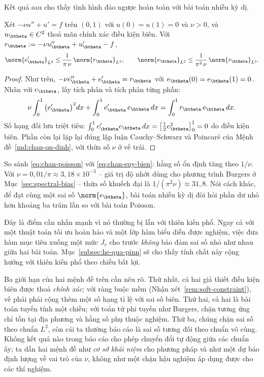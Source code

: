 Kết quả sau cho thấy tình hình đảo ngược hoàn toàn với bài toán nhiễu kỳ dị.
 
\begin{menhde}
\label{md:chan-suy-bien}
Xét $-\nu u'' + u' = f$ trên $(0,1)$ với $u(0) = u(1) = 0$ và $\nu > 0$, và
$u_{\btheta} \in C^2$ thoả mãn chính xác điều kiện biên. Với
$r_{\btheta} := -\nu u_{\btheta}'' + u_{\btheta}' - f$,
\begin{equation}
\norm{e_{\btheta}'}_{L^2} \le \frac{1}{\pi\,\nu}\,\norm{r_{\btheta}}_{L^2},
\qquad
\norm{e_{\btheta}}_{L^2} \le \frac{1}{\pi^{2}\,\nu}\,\norm{r_{\btheta}}_{L^2}.
\label{eq:chan-suy-bien}
\end{equation}
\end{menhde}
 
\begin{proof}
Như trên, $-\nu e_{\btheta}'' + e_{\btheta}' = r_{\btheta}$ với
$e_{\btheta}(0) = e_{\btheta}(1) = 0$. Nhân với $e_{\btheta}$, lấy tích phân và
tích phân từng phần:
\[
\nu\int_0^1 \big(e_{\btheta}'\big)^2 dx
 + \int_0^1 e_{\btheta}'\,e_{\btheta}\,dx
 = \int_0^1 r_{\btheta}\,e_{\btheta}\,dx .
\]
Số hạng đối lưu triệt tiêu:
$\int_0^1 e_{\btheta}'e_{\btheta}\,dx
= \big[\tfrac12 e_{\btheta}^2\big]_0^1 = 0$ do điều kiện biên. Phần còn lại lặp
lại đúng lập luận Cauchy--Schwarz và Poincaré của
Mệnh đề~\ref{md:chan-on-dinh}, với thừa số $\nu$ ở vế trái.
\end{proof}
 
\begin{nhanxet}
\label{nx:doc-chan}
So sánh \eqref{eq:chan-poisson} với \eqref{eq:chan-suy-bien}: hằng số ổn định
tăng theo $1/\nu$. Với $\nu = 0{,}01/\pi \approx 3{,}18\times10^{-3}$ -- giá trị
độ nhớt dùng cho phương trình Burgers ở Mục~\ref{sec:spectral-bias} -- thừa số
khuếch đại là $1/(\pi^2\nu) \approx 31{,}8$. Nói cách khác, để đạt cùng một sai
số $\norm{e_{\btheta}}$, bài toán nhiễu kỳ dị đòi hỏi phần dư nhỏ hơn khoảng ba
trăm lần so với bài toán Poisson.
 
Đây là điểm cần nhấn mạnh vì nó thường bị lẫn với thiên kiến phổ. Ngay cả với một
thuật toán tối ưu hoàn hảo và một lớp hàm biểu diễn được nghiệm, việc đưa hàm mục
tiêu xuống một mức $J_r$ cho trước \emph{không} bảo đảm sai số nhỏ như nhau giữa
hai bài toán. Mục~\ref{subsec:he-qua-pinn} sẽ cho thấy tính chất này cộng hưởng
với thiên kiến phổ theo chiều bất lợi.
 
Ba giới hạn của hai mệnh đề trên cần nêu rõ. Thứ nhất, cả hai giả thiết điều kiện
biên được thoả \emph{chính xác}; với ràng buộc mềm
(Nhận xét~\ref{rem:soft-constraint}), vế phải phải cộng thêm một số hạng tỉ lệ
với sai số biên. Thứ hai, cả hai là bài toán tuyến tính một chiều; với toán tử
phi tuyến như Burgers, chặn tương ứng chỉ tồn tại địa phương và hằng số phụ thuộc
nghiệm. Thứ ba, chúng chặn sai số theo chuẩn $L^2$, còn cái ta thường báo cáo là
sai số tương đối theo chuẩn vô cùng. Không kết quả nào trong báo cáo cho phép
chuyển đổi tự động giữa các chuẩn ấy; ta dẫn hai mệnh đề như \emph{cơ sở khái
niệm} cho phương pháp và như một dự báo định lượng về vai trò của $\nu$, không
như một chặn hậu nghiệm áp dụng được cho các thí nghiệm.
\end{nhanxet}
 
